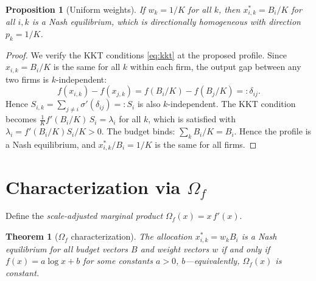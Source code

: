 \documentclass{article}
\newtheorem{proposition}{Proposition}
\newtheorem{theorem}{Theorem}
\theoremstyle{definition}
\begin{document}
\begin{proposition}[Uniform weights]\label{prop:w}
If $w_k = 1/K$ for all $k$, then $x_{i,k}^* = B_i/K$ for all $i, k$ is a Nash
equilibrium, which is directionally homogeneous with direction $p_k = 1/K$.
\end{proposition}

\begin{proof}
We verify the KKT conditions \eqref{eq:kkt} at the proposed profile.  Since
$x_{i,k} = B_i/K$ is the same for all $k$ within each firm, the output gap
between any two firms is $k$-independent:
\[
  f(x_{i,k}) - f(x_{j,k}) = f(B_i/K) - f(B_j/K) =: \delta_{ij}.
\]
Hence $S_{i,k} = \sum_{j \neq i} \sigma'(\delta_{ij}) =: S_i$ is also $k$-independent.
The KKT condition becomes $\tfrac{1}{K} f'(B_i/K)\, S_i = \lambda_i$ for all $k$,
which is satisfied with $\lambda_i = f'(B_i/K) S_i / K > 0$.  The budget binds:
$\sum_k B_i/K = B_i$.  Hence the profile is a Nash equilibrium, and
$x_{i,k}^*/B_i = 1/K$ is the same for all firms.
\end{proof}

\section{Characterization via $\Omega_f$}

Define the \emph{scale-adjusted marginal product} $\Omega_f(x) = x\,f'(x)$.

\begin{theorem}[$\Omega_f$ characterization]\label{thm:log}
The allocation $x_{i,k}^* = w_k B_i$ is a Nash equilibrium for all budget
vectors $B$ and weight vectors $w$ if and only if $f(x) = a\log x + b$ for
some constants $a > 0$, $b$---equivalently, $\Omega_f(x)$ is constant.
\end{theorem}
\end{document}
